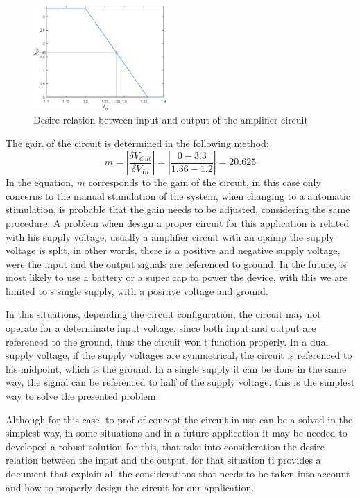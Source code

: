 \begin{figure}[]
    \centering
    \includegraphics[width=0.45\textwidth]{Chapters/4CHP/Figures/inOut.eps}
    \caption{Desire relation between input and output of the amplifier circuit}
    \label{fig:inVSout}
\end{figure}
The gain of the circuit is determined in the following method:
\begin{equation*}
   m = |\frac{\delta V_{Out}}{\delta V_{In}}| = |\frac{0-3.3}{1.36-1.2}| = 20.625
\end{equation*}
In the equation, $m$ corresponds to the gain of the circuit, in this case only concerns to the manual stimulation of the system, when changing to a automatic stimulation, is probable that the gain needs to be adjusted, considering the same procedure.
A problem when design a proper circuit for this application is related with his supply voltage, usually a amplifier circuit with an \acrshort{opamp} the supply voltage is split, in other words, there is a positive and negative supply voltage, were the input and the output signals are referenced to ground. In the future, is most likely to use a battery or a super cap to power the device, with this we are limited to s single supply, with a positive voltage and ground. 

In this situations, depending the circuit configuration, the circuit may not operate for a determinate input voltage, since both input and output are referenced to the ground, thus the circuit won't function properly. In a dual supply voltage, if the supply voltages are symmetrical, the circuit is referenced to his midpoint, which is the ground. In a single supply it can be done in the same way, the signal can be referenced to half of the supply voltage, this is the simplest way to solve the presented problem. 

Although for this case, to prof of concept the circuit in use can be a solved in the simplest way, in some situations and in a future application it may be needed to developed a robust solution for this, that take into consideration the desire relation between the input and the output, for that situation \acrshort{ti} provides a document that explain all the considerations that needs to be taken into account and how to properly design the circuit for our application\cite{manciniSingleSupplyOpAmp}.

